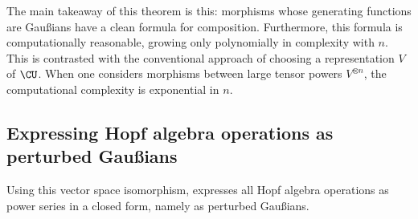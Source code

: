 The main takeaway of this theorem is this: morphisms whose generating functions
are Gaußians have a clean formula for composition. Furthermore, this formula is
computationally reasonable, growing only polynomially in complexity with $n$.
This is contrasted with the conventional approach of choosing a representation
$V$ of $\CU$. When one considers morphisms between large tensor powers
$V^{\otimes n}$, the computational complexity is exponential in $n$.

\subsection{Expressing Hopf algebra operations as perturbed Gaußians}

Using this vector space isomorphism, \cite{BV} expresses all Hopf algebra
operations as power series in a closed form, namely as perturbed Gaußians.


